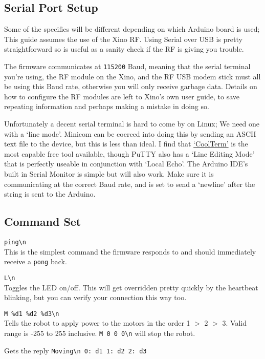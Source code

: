 \subsection{Serial Port Setup}

Some of the specifics will be different depending on which Arduino board is used; This guide assumes the use of the Xino RF. Using Serial over USB is pretty straightforward so is useful as a sanity check if the RF is giving you trouble.

The firmware communicates at \texttt{115200} Baud, meaning that the serial terminal you're using, the RF module on the Xino, and the RF USB modem stick must all be using this Baud rate, otherwise you will only receive garbage data. Details on how to configure the RF modules are left to Xino's own user guide, to save repeating information and perhaps making a mistake in doing so.

Unfortunately a decent serial terminal is hard to come by on Linux; We need one with a `line mode'. Minicom can be coerced into doing this by sending an ASCII text file to the device, but this is less than ideal. I find that \href{http://freeware.the-meiers.org/}{`CoolTerm'} is the most capable free tool available, though PuTTY also has a `Line Editing Mode' that is perfectly useable in conjunction with `Local Echo'. The Arduino IDE's built in Serial Monitor is simple but will also work. Make sure it is communicating at the correct Baud rate, and is set to send a `newline' after the string is sent to the Arduino.

\subsection{Command Set}

\verb|ping\n|\\
This is the simplest command the firmware responds to and should immediately receive a \verb|pong| back.

\verb|L\n|\\
Toggles the LED on/off. This will get overridden pretty quickly by the heartbeat blinking, but you can verify your connection this way too.

\verb|M %d1 %d2 %d3\n|\\
Tells the robot to apply power to the motors in the order 1 $>$ 2 $>$ 3. Valid range is -255 to 255 inclusive. \verb|M 0 0 0\n| will stop the robot.

Gets the reply \verb|Moving\n 0: d1 1: d2 2: d3|


